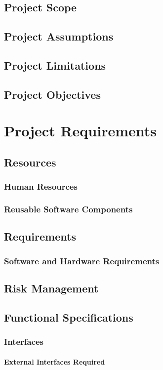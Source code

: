 \documentclass[openany]{report}
\begin{document}
\section{Project Scope}
\section{Project Assumptions}
\section{Project Limitations}
\section{Project Objectives}

\chapter{Project Requirements}

\section{Resources}
\subsection{Human Resources}
\subsection{Reusable Software Components}
\section{Requirements}
\subsection{Software and Hardware Requirements}
\section{Risk Management}
\section{Functional Specifications}
\subsection{Interfaces}
\subsubsection{External Interfaces Required}
\end{document}
